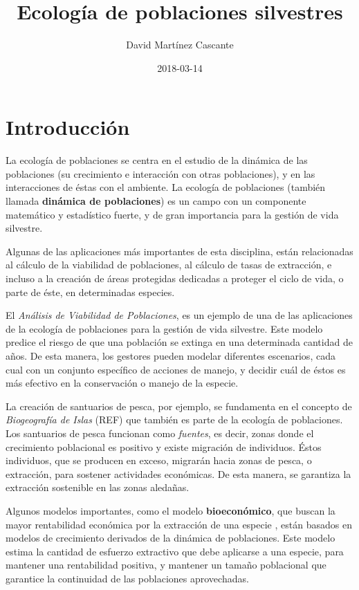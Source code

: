 \documentclass[12pt,letterpaper,]{book}
\title{Ecología de poblaciones silvestres}
\author{David Martínez Cascante}
\date{2018-03-14}
\begin{document}
\maketitle

{
\hypersetup{linkcolor=black}
\setcounter{tocdepth}{1}
\tableofcontents
}
\chapter{Introducción}\label{intro}

La ecología de poblaciones se centra en
el estudio de la dinámica de las
poblaciones (su crecimiento e
interacción con otras poblaciones), y en las interacciones de éstas con
el ambiente. La ecología de poblaciones (también llamada
\textbf{dinámica de poblaciones}) es un campo con un componente
matemático y estadístico fuerte, y de gran importancia para la gestión
de vida silvestre.

Algunas de las aplicaciones más importantes de esta disciplina, están
relacionadas al cálculo de la viabilidad de poblaciones, al cálculo de
tasas de extracción, e incluso a la creación de áreas protegidas
dedicadas a proteger el ciclo de vida, o parte de éste, en determinadas
especies.

El \emph{Análisis de Viabilidad de Poblaciones}, es un ejemplo de una de
las aplicaciones de la ecología de poblaciones para la gestión de vida
silvestre. Este modelo predice el riesgo de que una población se extinga
en una determinada cantidad de años. De esta manera, los gestores pueden
modelar diferentes escenarios, cada cual con un conjunto específico de
acciones de manejo, y decidir cuál de éstos es más efectivo en la
conservación o manejo de la especie.

La creación de santuarios de pesca, por ejemplo, se fundamenta en el
concepto de \emph{Biogeografía de Islas} (REF) que también es parte de
la ecología de poblaciones. Los santuarios de pesca funcionan como
\emph{fuentes}, es decir, zonas donde el crecimiento poblacional es
positivo y existe migración de individuos. Éstos individuos, que se
producen en exceso, migrarán hacia zonas de pesca, o extracción, para
sostener actividades económicas. De esta manera, se garantiza la
extracción sostenible en las zonas aledañas.

Algunos modelos importantes, como el modelo \textbf{bioeconómico}, que
buscan la mayor rentabilidad económica por la extracción de una especie
\citep{Grafton2006}, están basados en modelos de crecimiento derivados
de la dinámica de poblaciones. Este modelo estima la cantidad de
esfuerzo extractivo que debe aplicarse a una especie, para mantener una
rentabilidad positiva, y mantener un tamaño poblacional que garantice la
continuidad de las poblaciones aprovechadas.
\end{document}
